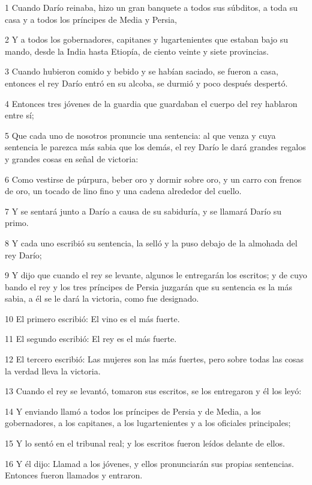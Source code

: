 \par 1 Cuando Darío reinaba, hizo un gran banquete a todos sus súbditos, a toda su casa y a todos los príncipes de Media y Persia,
\par 2 Y a todos los gobernadores, capitanes y lugartenientes que estaban bajo su mando, desde la India hasta Etiopía, de ciento veinte y siete provincias.
\par 3 Cuando hubieron comido y bebido y se habían saciado, se fueron a casa, entonces el rey Darío entró en su alcoba, se durmió y poco después despertó.
\par 4 Entonces tres jóvenes de la guardia que guardaban el cuerpo del rey hablaron entre sí;
\par 5 Que cada uno de nosotros pronuncie una sentencia: al que venza y cuya sentencia le parezca más sabia que los demás, el rey Darío le dará grandes regalos y grandes cosas en señal de victoria:
\par 6 Como vestirse de púrpura, beber oro y dormir sobre oro, y un carro con frenos de oro, un tocado de lino fino y una cadena alrededor del cuello.
\par 7 Y se sentará junto a Darío a causa de su sabiduría, y se llamará Darío su primo.
\par 8 Y cada uno escribió su sentencia, la selló y la puso debajo de la almohada del rey Darío;
\par 9 Y dijo que cuando el rey se levante, algunos le entregarán los escritos; y de cuyo bando el rey y los tres príncipes de Persia juzgarán que su sentencia es la más sabia, a él se le dará la victoria, como fue designado.
\par 10 El primero escribió: El vino es el más fuerte.
\par 11 El segundo escribió: El rey es el más fuerte.
\par 12 El tercero escribió: Las mujeres son las más fuertes, pero sobre todas las cosas la verdad lleva la victoria.
\par 13 Cuando el rey se levantó, tomaron sus escritos, se los entregaron y él los leyó:
\par 14 Y enviando llamó a todos los príncipes de Persia y de Media, a los gobernadores, a los capitanes, a los lugartenientes y a los oficiales principales;
\par 15 Y lo sentó en el tribunal real; y los escritos fueron leídos delante de ellos.
\par 16 Y él dijo: Llamad a los jóvenes, y ellos pronunciarán sus propias sentencias. Entonces fueron llamados y entraron.
